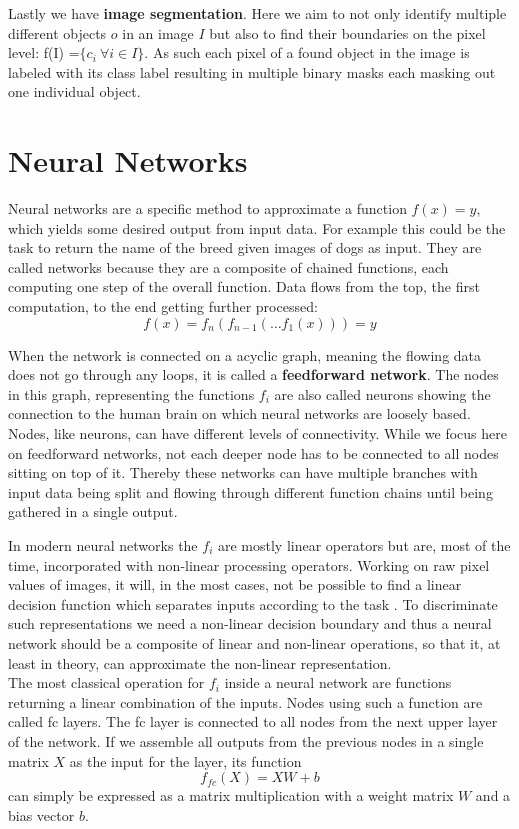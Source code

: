 Lastly we have \textbf{image segmentation}. Here we aim to not only identify multiple different objects $o$ in an image $I$ but also to find their boundaries on the pixel level: f(I) =$ \{ c_i\ \forall i \in I\}$. As such each pixel of a found object in the image is labeled with its class label resulting in multiple binary masks each masking out one individual object.

\section{Neural Networks}
\label{sec:concepts:nn}
Neural networks are a specific method to approximate a function $f(x) = y$, which yields some desired output from input data. For example this could be the task to return the name of the breed given images of dogs as input. They are called networks because they are a composite of chained functions, each computing one step of the overall function. Data flows from the top, the first computation, to the end getting further processed:
\begin{equation}
    f(x) = f_n(f_{n-1}(\dots f_1(x))) = y
\end{equation}

When the network is connected on a acyclic graph, meaning the flowing data does not go through any loops, it is called a \textbf{feedforward network}. The nodes in this graph, representing the functions $f_i$ are also called neurons showing the connection to the human brain on which neural networks are loosely based. Nodes, like neurons, can have different levels of connectivity. While we focus here on feedforward networks, not each deeper node has to be connected to all nodes sitting on top of it. Thereby these networks can have multiple branches with input data being split and flowing through different function chains until being gathered in a single output.

In modern neural networks the $f_i$ are mostly linear operators but are, most of the time, incorporated with non-linear processing operators. Working on raw pixel values of images, it will, in the most cases, not be possible to find a linear decision function which separates inputs according to the task \citep{lecun_deep_2015}. To discriminate such representations we need a non-linear decision boundary and thus a neural network should be a composite of linear and non-linear operations, so that it, at least in theory, can approximate the non-linear representation.\\
The most classical operation for $f_i$ inside a neural network are functions returning a linear combination of the inputs. Nodes using such a function are called \acrfull{fc} layers. The \gls{fc} layer is connected to all nodes from the next upper layer of the network. If we assemble all outputs from the previous nodes in a single matrix $X$ as the input for the layer, its function
\begin{equation}
    f_{fc}(X) = XW + b
\end{equation}
can simply be expressed as a matrix multiplication with a weight matrix $W$ and a bias vector $b$.\\

